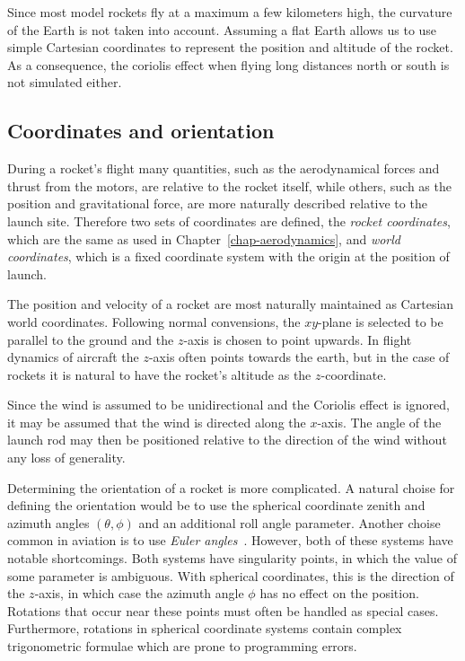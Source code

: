 Since most model rockets fly at a maximum a few kilometers high, the
curvature of the Earth is not taken into account.  Assuming a flat
Earth allows us to use simple Cartesian coordinates to represent the
position and altitude of the rocket.  As a consequence, the coriolis
effect when flying long distances north or south is not simulated
either.



\subsection{Coordinates and orientation}

During a rocket's flight many quantities, such as the aerodynamical
forces and thrust from the motors, are relative to the rocket itself,
while others, such as the position and gravitational force, are more
naturally described relative to the launch site.  Therefore two sets
of coordinates are defined, the {\it rocket coordinates}, which are
the same as used in Chapter~\ref{chap-aerodynamics}, and 
{\it world coordinates}, which is a fixed coordinate system with the
origin at the position of launch.

The position and velocity of a rocket are most naturally maintained as
Cartesian world coordinates.  Following normal convensions, the
$xy$-plane is selected to be parallel to the ground and the $z$-axis
is chosen to point upwards.  In flight dynamics of aircraft the
$z$-axis often points towards the earth, but in the case of rockets it
is natural to have the rocket's altitude as the $z$-coordinate.

Since the wind is assumed to be unidirectional and the Coriolis effect
is ignored, it may be assumed that the wind is directed along the
$x$-axis.  The angle of the launch rod may then be positioned relative
to the direction of the wind without any loss of generality.

Determining the orientation of a rocket is more complicated.  A
natural choise for defining the orientation would be to use the
spherical coordinate zenith and azimuth angles $(\theta, \phi)$ and an
additional roll angle parameter.  Another choise common in aviation is
to use {\it Euler angles}~\cite{wiki-euler-angles}.  However, both of
these systems have notable shortcomings.  Both systems have
singularity points, in which the value of some parameter is
ambiguous.  With spherical coordinates, this is the direction of the
$z$-axis, in which case the azimuth angle $\phi$ has no effect on the
position.  Rotations that occur near these points must often be
handled as special cases.  Furthermore, rotations in spherical
coordinate systems contain complex trigonometric formulae which are
prone to programming errors.


